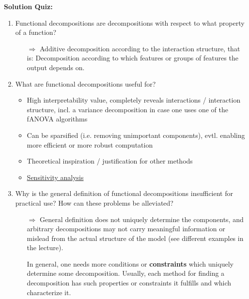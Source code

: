 \textbf{Solution Quiz:}\\\noindent
\medskip

\begin{enumerate}

    \item 
    Functional decompositions are decompositions with respect to what property of a function?
    \begin{itemize}
        \item[$\Rightarrow$] Additive decomposition according to the interaction structure, that is: Decomposition according to which features or groups of features the output depends on.
    \end{itemize}
    \item 
    What are functional decompositions useful for?
    \begin{itemize}
        \item 
        High interpretability value, completely reveals interactions / interaction structure, incl. a variance decomposition in case one uses one of the fANOVA algorithms
        \item Can be sparsified (i.e. removing unimportant components), evtl. enabling more efficient or more robust computation
        \item 
        Theoretical inspiration / justification for other methods
        \item \href{https://en.wikipedia.org/wiki/Sensitivity_analysis}{Sensitivity analysis}
    \end{itemize}
    \item 
    Why is the general definition of functional decompositions insufficient for practical use? How can these problems be alleviated?
    \begin{itemize}
        \item[$\Rightarrow$]
        General definition does not uniquely determine the components, and arbitrary decompositions may not carry meaningful information or mislead from the actual structure of the model (see different examples in the lecture).

        In general, one needs more conditions or \textbf{constraints} which uniquely determine some decomposition.
        Usually, each method for finding a decomposition has such properties or constraints it fulfills and which characterize it.


\end{itemize}
\end{enumerate}
